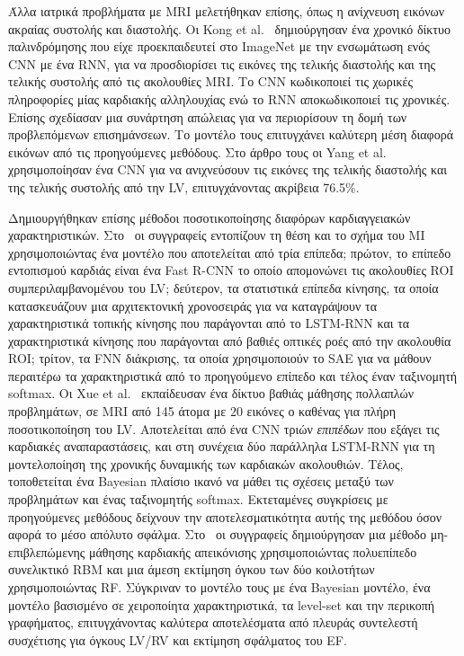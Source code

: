 Άλλα ιατρικά προβλήματα με MRI μελετήθηκαν επίσης, όπως η ανίχνευση εικόνων ακραίας συστολής και διαστολής.
Οι Kong et al.~\cite{kong2016recognizing} δημιούργησαν ένα χρονικό δίκτυο παλινδρόμησης που είχε προεκπαιδευτεί στο ImageNet με την ενσωμάτωση ενός CNN με ένα RNN, για να προσδιορίσει τις εικόνες της τελικής διαστολής και της τελικής συστολής από τις ακολουθίες MRI\@.
Το CNN κωδικοποιεί τις χωρικές πληροφορίες μίας καρδιακής αλληλουχίας ενώ το RNN αποκωδικοποιεί τις χρονικές.
Επίσης σχεδίασαν μια συνάρτηση απώλειας για να περιορίσουν τη δομή των προβλεπόμενων επισημάνσεων.
Το μοντέλο τους επιτυγχάνει καλύτερη μέση διαφορά εικόνων από τις προηγούμενες μεθόδους.
Στο άρθρο τους οι Yang et al.~\cite{yang2017convolutional} χρησιμοποίησαν ένα CNN για να ανιχνεύσουν τις εικόνες της τελικής διαστολής και της τελικής συστολής από την LV, επιτυγχάνοντας ακρίβεια 76.5\%.

Δημιουργήθηκαν επίσης μέθοδοι ποσοτικοποίησης διαφόρων καρδιαγγειακών χαρακτηριστικών.
Στο~\cite{xu2017direct} οι συγγραφείς εντοπίζουν τη θέση και το σχήμα του ΜΙ χρησιμοποιώντας ένα μοντέλο που αποτελείται από τρία επίπεδα; πρώτον, το επίπεδο εντοπισμού καρδιάς είναι ένα Fast R-CNN το οποίο απομονώνει τις ακολουθίες ROI συμπεριλαμβανομένου του LV\@; δεύτερον, τα στατιστικά επίπεδα κίνησης, τα οποία κατασκευάζουν μια αρχιτεκτονική χρονοσειράς για να καταγράψουν τα χαρακτηριστικά τοπικής κίνησης που παράγονται από το LSTM-RNN και τα χαρακτηριστικά κίνησης που παράγονται από βαθιές οπτικές ροές από την ακολουθία ROI\@; τρίτον, τα FNN διάκρισης, τα οποία χρησιμοποιούν το SAE για να μάθουν περαιτέρω τα χαρακτηριστικά από το προηγούμενο επίπεδο και τέλος έναν ταξινομητή softmax\@.
Οι Xue et al.~\cite{xue2018full} εκπαίδευσαν ένα δίκτυο βαθιάς μάθησης πολλαπλών προβλημάτων, σε MRI από 145 άτομα με 20 εικόνες ο καθένας για πλήρη ποσοτικοποίηση του LV\@.
Αποτελείται από ένα CNN τριών \textit{επιπέδων} που εξάγει τις καρδιακές αναπαραστάσεις, και στη συνέχεια δύο παράλληλα LSTM-RNN για τη μοντελοποίηση της χρονικής δυναμικής των καρδιακών ακολουθιών.
Τέλος, τοποθετείται ένα Bayesian πλαίσιο ικανό να μάθει τις σχέσεις μεταξύ των προβλημάτων και ένας ταξινομητής softmax.
Εκτεταμένες συγκρίσεις με προηγούμενες μεθόδους δείχνουν την αποτελεσματικότητα αυτής της μεθόδου όσον αφορά το μέσο απόλυτο σφάλμα.
Στο~\cite{zhen2016multi} οι συγγραφείς δημιούργησαν μια μέθοδο μη-επιβλεπώμενης μάθησης καρδιακής απεικόνισης χρησιμοποιώντας πολυεπίπεδο συνελικτικό RBM και μια άμεση εκτίμηση όγκου των δύο κοιλοτήτων χρησιμοποιώντας RF\@.
Σύγκριναν το μοντέλο τους με ένα Bayesian μοντέλο, ένα μοντέλο βασισμένο σε χειροποίητα χαρακτηριστικά, τα level-set και την περικοπή γραφήματος, επιτυγχάνοντας καλύτερα αποτελέσματα από πλευράς συντελεστή συσχέτισης για όγκους LV/RV και εκτίμηση σφάλματος του EF\@.

